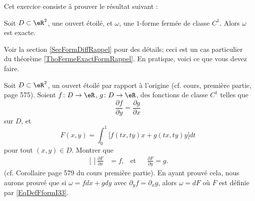 
\begin{exercice}\label{exoCourbesSurfaces0017}

Cet exercice consiste à prouver le résultat suivant :
\begin{theorem}
Soit $D\subset\eR^2$, une ouvert étoilé, et $\omega$, une $1$-forme fermée de classe $C^1$. Alors $\omega$ est exacte.
\end{theorem}
Voir la section \ref{SecFormDiffRappel} pour des détails; ceci est un cas particulier du théorème \ref{ThoFermeExactFormRappel}. En pratique, voici ce que vous devez faire.

Soit $D\subset\eR^2$, un ouvert étoilé par rapport à l'origine (cf. cours, première partie, page 575). Soient $f\colon D\to \eR$, $g\colon D\to \eR$, des fonctions de classe $C^1$ telles que
\begin{equation}
	\frac{ \partial f }{ \partial y }=\frac{ \partial g }{ \partial x }
\end{equation}
sur $D$, et
\begin{equation}		\label{EqDefFformI33}
	F(x,y)=\int_0^1\big[  f(tx,ty)x+g(tx,ty)y  \big]dt
\end{equation}
pour tout $(x,y)\in D$. Montrer que
\begin{equation}		\label{EqFormI33Fffdd}
	\begin{aligned}[]
		\frac{ \partial F }{ \partial x }&=f,  &\text{et}&& \frac{ \partial F }{ \partial y }=g.
	\end{aligned}
\end{equation}
(cf. Corollaire page 579 du cours première partie). En ayant prouvé cela, nous aurons prouvé que si $\omega=fdx+gdy$ avec $\partial_yf=\partial_xg$, alors $\omega=dF$ où $F$ est définie par \eqref{EqDefFformI33}.


\end{exercice}
